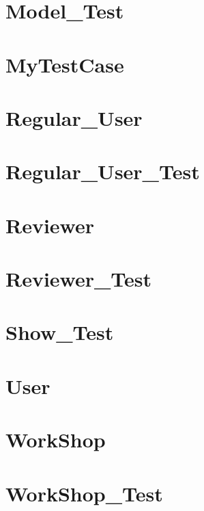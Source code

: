 \documentclass{article}
\begin{document}
\section{Model\_Test}

\section{MyTestCase}

\section{Regular\_User}

\section{Regular\_User\_Test}

\section{Reviewer}

\section{Reviewer\_Test}

\section{Show\_Test}

\section{User}

\section{WorkShop}

\section{WorkShop\_Test}

\end{document}
